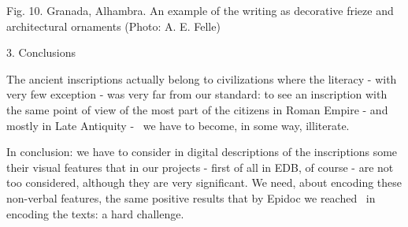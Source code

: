 \documentclass[amsthm,ebook]{saparticle}
\begin{document}
Fig. 10. Granada, Alhambra. An example of the writing as decorative frieze and architectural ornaments (Photo: A. E.
Felle)


\bigskip


\bigskip


\bigskip


\bigskip


\bigskip

3. Conclusions

The ancient inscriptions actually belong to civilizations where the literacy - with very few exception - was very far
from our standard: to see an inscription with the same point of view of the most part of the citizens in Roman Empire -
and mostly in Late Antiquity - \ we have to become, in some way, illiterate. 

In conclusion: we have to consider in digital descriptions of the inscriptions some their {\textquotedbl}visual
features{\textquotedbl} that in our projects - first of all in EDB, of course - are not too considered, although they
are very significant. We need, about encoding these non-verbal features, the same positive results that by Epidoc we
reached \ in encoding the texts: a hard challenge.



\end{document}
